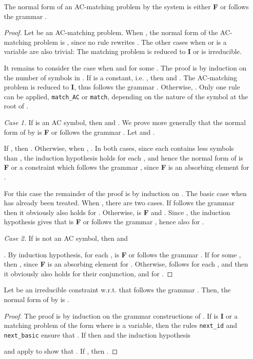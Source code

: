 \documentclass[submission,copyright,creativecommons]{eptcs}
\numberwithin{subcase}{case}
\begin{document}
\begin{lemma}
\label{R12:NF:lemma}
The normal form of an AC-matching problem by the system  is either \textbf{F} or follows the  grammar .
\end{lemma}
\begin{proof}
Let   be an AC-matching problem. When
,
 the normal form of the AC-matching problem is , since no
 rule rewrites . The other cases when  or  is a variable
 are also trivial: The matching problem is reduced to \textbf{I} or is irreducible.
 
It remains to consider the case when  and
 for some .
The proof is by induction on the number of symbols in .
If  is a constant, i.e. , then  and . The AC-matching
problem  is reduced to \textbf{I}, thus follows the  grammar
.
Otherwise, . Only one rule can be applied, \texttt{match\_AC} or
\texttt{match}, depending on the nature of the symbol  at the root of .

\noindent \emph{Case 1.} If  is an AC symbol, then  and
. We
prove more generally that the normal form of  by
  is \textbf{F} or follows the grammar
.  Let  and .

If , then . Otherwise, when
, .
In both cases, since each  contains less symbols than , the induction
hypothesis holds for each , and hence the normal form  of  is \textbf{F} or a constraint
which follows the grammar , since \textbf{F} is an absorbing element
for .

For this case the remainder of the proof is by induction on . The
basic case when  has already been treated. When ,
there are two cases. If  follows the grammar  then it obviously
also holds for . Otherwise,  is \textbf{F}
and .
Since , the  induction hypothesis gives that
 is \textbf{F} or follows the grammar
, hence also for .

\noindent \emph{Case 2.}
If  is not an AC symbol, then  and 
 
 .
By induction hypothesis, for each ,  is 
\textbf{F} or follows the grammar . If
 for some , then
, since \textbf{F} is an
absorbing element for . Otherwise,  follows
 for each , and then it
obviously  also holds for their conjunction, and for .
\end{proof}

\begin{lemma}
\label{stabl1:lemma}
Let  be an irreducible constraint w.r.t. 
 that follows  the grammar . Then, the normal form
of  by  is .
\end{lemma}

\begin{proof}
The proof is by induction on the grammar constructions of .
If  is \textbf{I} or a matching problem of the
form   where  is a variable, then the rules
\texttt{next\_id} and \texttt{next\_basic} ensure that .  If  then  and the induction hypothesis 
  
and  apply to show that
. 
If ,
then .
\end{proof}
\end{document}
